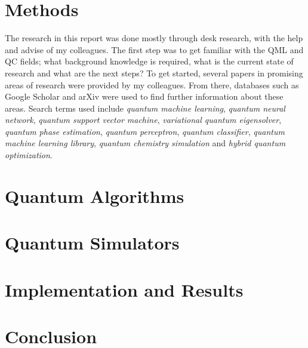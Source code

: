 \documentclass[a4paper,11pt]{article}
\begin{document}
\section{Methods} \label{sec:methods}
The research in this report was done mostly through desk research, with the help and advise of my colleagues.
The first step was to get familiar with the QML and QC fields; what background knowledge is required, what is the current state of research and what are the next steps?
To get started, several papers in promising areas of research were provided by my colleagues. 
From there, databases such as Google Scholar and arXiv were used to find further information about these areas.
Search terms used include \emph{quantum machine learning}, \emph{quantum neural network}, \emph{quantum support vector machine}, \emph{variational quantum eigensolver}, \emph{quantum phase estimation}, \emph{quantum perceptron}, \emph{quantum classifier}, \emph{quantum machine learning library}, \emph{quantum chemistry simulation} and \emph{hybrid quantum optimization}.

\section{Quantum Algorithms} \label{sec:quantum-algorithms}

\section{Quantum Simulators} \label{sec:quantum-simulators}

\section{Implementation and Results} \label{sec:implementation-and-results}

\section{Conclusion} \label{sec:conclusion}

\printbibliography[heading=bibintoc]
\end{document}

